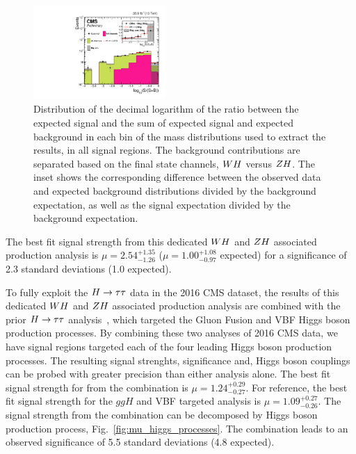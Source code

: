 \begin{figure}[!ht]
 \begin{center}
  \includegraphics[width=0.45\textwidth]{higgs_to_taus_vh/plots/combined/wh_vs_zh_sbweight.pdf}
 \end{center}
 \caption{
 Distribution of the decimal logarithm of the ratio between the expected signal and the 
 sum of expected signal and expected background in each bin of the mass distributions 
 used to extract the results, in all signal regions. The background contributions are 
 separated based on the final state channels, $WH$ versus $ZH$. The inset 
 shows the corresponding difference between the 
 observed data and expected background distributions divided by the background expectation, 
 as well as the signal expectation divided by the background expectation.
 }
 \label{fig:sb}
\end{figure}



The best fit signal
strength from this dedicated $WH$ and $ZH$ associated production analysis is 
$\mu = 2.54 ^{+1.35} _{-1.26}$ ($\mu = 1.00 ^{+1.08} _{-0.97}$ expected) 
for a significance of 2.3 standard deviations (1.0 expected).

To fully exploit the $H \to \tau\tau$ data in the 2016 CMS dataset, the results
of this dedicated $WH$ and $ZH$ associated production analysis are combined with the prior
$H \to \tau\tau$ analysis~\cite{HIG-16-043}, which targeted the Gluon Fusion and
VBF Higgs boson production processes. By combining these two analyses of
2016 CMS data, we have signal regions targeted each of the four leading Higgs 
boson production processes. The resulting signal strenghts, significance and, Higgs
boson couplings can be probed with greater precision than either analysis alone.
The best fit signal strength for from the combination is $\mu = 1.24 ^{+0.29} _{-0.27}$.
For reference, the best fit signal strength for the $ggH$ and VBF targeted analysis
is $\mu = 1.09 ^{+0.27} _{-0.26}$.
The signal strength from the combination can be decomposed by Higgs boson production 
process, Fig.~\ref{fig:mu_higgs_processes}. The combination leads to an 
observed significance of 5.5 standard deviations (4.8 expected). 

